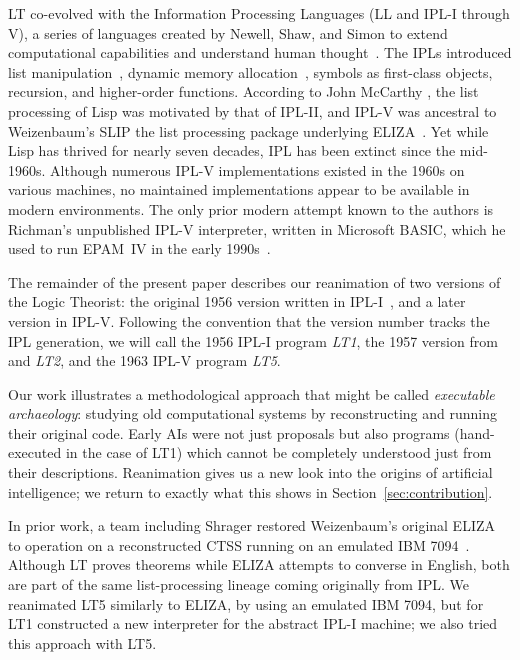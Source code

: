 \documentclass[journal]{IEEEtran}
\begin{document}
LT co-evolved with the Information Processing Languages (LL and IPL-I through V),
a series of languages created by Newell, Shaw, and Simon  
to extend computational capabilities and understand human thought~\cite[p.~II-17]{cip16june1958}.
The IPLs introduced list manipulation~\cite[section~2.6]{knuth1997}, dynamic memory allocation~\cite{cmuarchiveshawinterview},
symbols as first-class objects, recursion, and
higher-order functions.
According to John McCarthy \cite{HOPLLISP,mccarthy1960lisp}, the 
list processing of Lisp was
motivated by that of IPL-II, and IPL-V was ancestral
to 
Weizenbaum's SLIP \cite{SLIP1963} the list processing package underlying ELIZA~\cite{lane2025eliza}.  Yet while Lisp has thrived for
nearly seven decades, IPL has been extinct since the mid-1960s.
Although numerous IPL-V implementations existed in the 1960s on
various machines, no maintained implementations appear to be available
in modern environments. The only prior modern attempt known to the
authors is Richman's unpublished IPL-V interpreter, written in
Microsoft BASIC, which he used to run EPAM~IV in the early
1990s~\cite{richman1995epam}.

The remainder of the present paper describes our
reanimation of two versions of the Logic Theorist:
the original 1956 version written in IPL-I~\cite{LT1956b}, and a  
later version in IPL-V\cite{stefferud1963lt}.  Following the convention
that the version number tracks the IPL generation, we will call the
1956 IPL-I program \emph{LT1}, the 1957 version
from \cite{LT1957} and \cite{newellshaw1957} \emph{LT2},
and the 1963 IPL-V program \emph{LT5}.

Our work illustrates a methodological approach that might be called
\emph{executable archaeology}: studying old computational systems by
reconstructing and running their original code. Early AIs were not
just proposals but also programs (hand-executed in the case of LT1)
which cannot be completely understood just from their descriptions.
Reanimation gives us a new look into the origins of artificial
intelligence; we return to exactly what this shows in
Section~\ref{sec:contribution}.

In prior work, a team including Shrager restored
Weizenbaum's original ELIZA to operation on a reconstructed CTSS
running on an emulated IBM 7094~\cite{lane2025eliza}. Although 
LT proves theorems while ELIZA attempts to converse in English,
both are part of the same list-processing lineage coming originally
from IPL.  We reanimated LT5 similarly to ELIZA, by using
an emulated IBM 7094, but for LT1 constructed a new interpreter
for the abstract IPL-I machine; we also tried this approach
with LT5.
\end{document}
